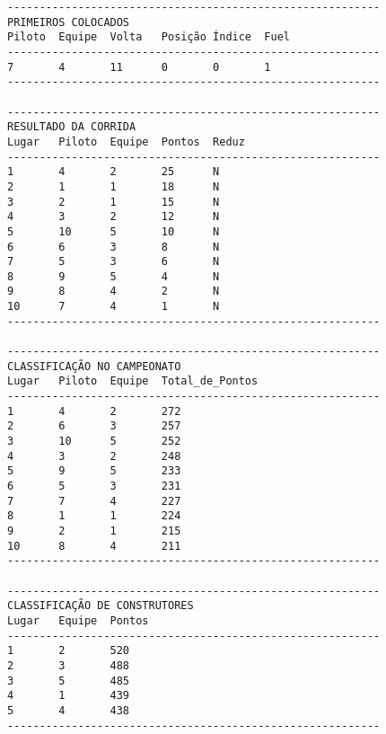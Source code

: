 \documentclass[12pt]{article}
\begin{document}
\begin{verbatim}
----------------------------------------------------------
PRIMEIROS COLOCADOS
Piloto  Equipe  Volta   Posição Índice  Fuel
----------------------------------------------------------
7       4       11      0       0       1
----------------------------------------------------------

----------------------------------------------------------
RESULTADO DA CORRIDA
Lugar   Piloto  Equipe  Pontos  Reduz
----------------------------------------------------------
1       4       2       25      N
2       1       1       18      N
3       2       1       15      N
4       3       2       12      N
5       10      5       10      N
6       6       3       8       N
7       5       3       6       N
8       9       5       4       N
9       8       4       2       N
10      7       4       1       N
----------------------------------------------------------

----------------------------------------------------------
CLASSIFICAÇÃO NO CAMPEONATO
Lugar   Piloto  Equipe  Total_de_Pontos
----------------------------------------------------------
1       4       2       272
2       6       3       257
3       10      5       252
4       3       2       248
5       9       5       233
6       5       3       231
7       7       4       227
8       1       1       224
9       2       1       215
10      8       4       211
----------------------------------------------------------

----------------------------------------------------------
CLASSIFICAÇÃO DE CONSTRUTORES
Lugar   Equipe  Pontos
----------------------------------------------------------
1       2       520
2       3       488
3       5       485
4       1       439
5       4       438
----------------------------------------------------------
\end{verbatim}

\end{document}
